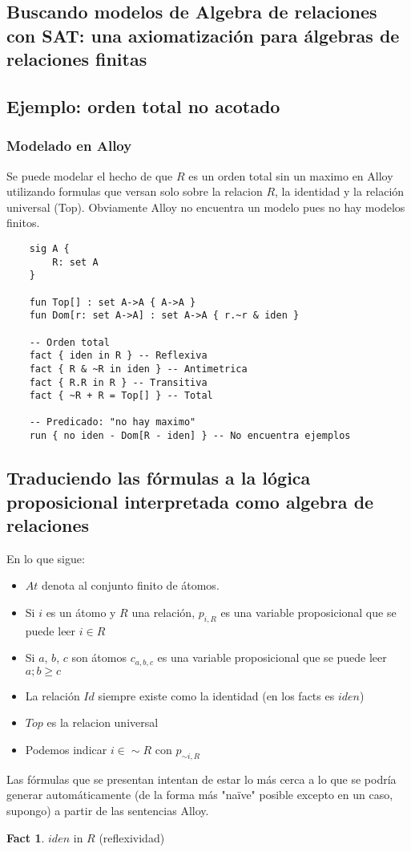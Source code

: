 \documentclass{article}
\theoremstyle{definition}
\newtheorem*{fact}{Fact}
\begin{document}
\begin{center}
\subsection*{Buscando modelos de Algebra de relaciones con SAT: una axiomatización para álgebras de relaciones finitas}

\end{center}
\subsection*{Ejemplo: orden total no acotado}
\subsubsection*{ Modelado en Alloy }
Se puede modelar el hecho de que $R$ es un orden total sin un maximo en Alloy utilizando formulas que versan solo sobre la relacion $R$, la identidad y la relación universal (Top). Obviamente Alloy no encuentra un modelo pues no hay modelos finitos.

\begin{verbatim}
    sig A {
    	R: set A
    }
    
    fun Top[] : set A->A { A->A }
    fun Dom[r: set A->A] : set A->A { r.~r & iden }
    
    -- Orden total
    fact { iden in R } -- Reflexiva
    fact { R & ~R in iden } -- Antimetrica
    fact { R.R in R } -- Transitiva
    fact { ~R + R = Top[] } -- Total

    -- Predicado: "no hay maximo"
    run { no iden - Dom[R - iden] } -- No encuentra ejemplos
\end{verbatim}

\subsection*{Traduciendo las fórmulas a la lógica proposicional interpretada como algebra de relaciones}

En lo que sigue: 
\begin{itemize}
\item $At$ denota al conjunto finito de átomos. 
\item Si $i$ es un átomo y $R$ una relación, $p_{i,R}$ es una variable proposicional que se puede leer $i \in R$ 
\item Si $a$, $b$, $c$ son átomos $c_{a,b,c}$ es una variable proposicional que se puede leer $a;b \ge c$ 
\item La relación $Id$ siempre existe como la identidad (en los facts es $iden$) 
\item $Top$ es la relacion universal 
\item Podemos indicar $i \in \sim R$ con $p_{\sim i, R}$
\end{itemize}
\vspace{10px}
Las fórmulas que se presentan intentan de estar lo más cerca a lo que se podría generar automáticamente (de la forma más "naïve" posible excepto en un caso, supongo) a partir de las sentencias Alloy.
\begin{fact} $iden$ in $R$ (reflexividad)
\end{fact} 
\end{document}
